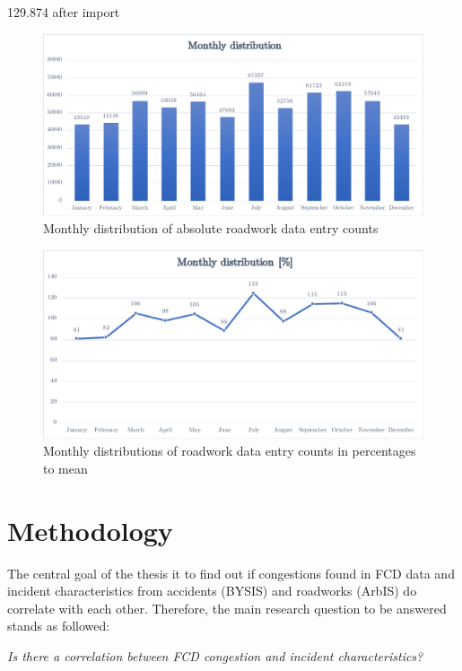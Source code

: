 \documentclass[a4paper,12pt]{report}
\begin{document}
129.874 after import

\begin{figure}[h]
	\centering
	\includegraphics[scale=0.6]{./assets/arbis_dataset_monthly_absolute}
	\caption{Monthly distribution of absolute roadwork data entry counts}
	\label{img:arbis_dataset_monthly_absolute}
\end{figure}

\begin{figure}[h]
	\centering
	\includegraphics[scale=0.6]{./assets/arbis_dataset_monthly_percentage}
	\caption{Monthly distributions of roadwork data entry counts in percentages to mean}
	\label{img:arbis_dataset_monthly_percentage}
\end{figure}


\chapter{Methodology}
The central goal of the thesis it to find out if congestions found in FCD data and incident characteristics from accidents (BYSIS) and roadworks (ArbIS) do correlate with each other. Therefore, the main research question to be answered stands as followed:

\begin{center}
	\textit{Is there a correlation between FCD congestion and incident characteristics?}
\end{center}
\end{document}
